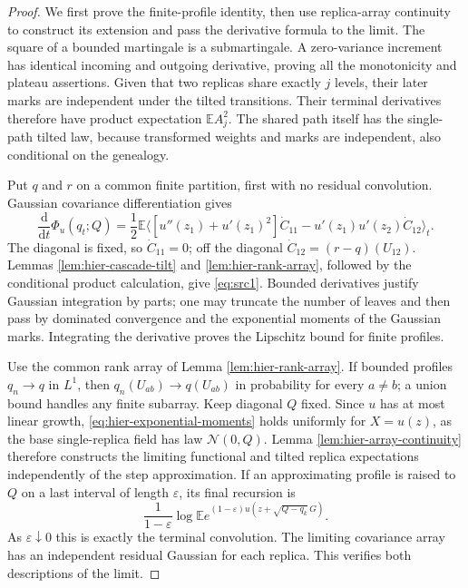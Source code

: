 \documentclass[11pt,a4paper]{article}
\numberwithin{equation}{section}
\theoremstyle{definition}
\theoremstyle{remark}
\newcommand{\E}{\mathbb E}
\newcommand{\dd}{\mathrm d}
\newcommand{\cN}{\mathcal N}
\begin{document}
\begin{proof}
We first prove the finite-profile identity, then use replica-array
continuity to construct its extension and pass the derivative formula to
the limit.
The square of a bounded martingale is a submartingale.  A zero-variance
increment has identical incoming and outgoing derivative, proving all the
monotonicity and plateau assertions.  Given that two replicas share exactly
$j$ levels, their later marks are independent under the tilted transitions.
Their terminal derivatives therefore have product expectation $\E A_j^2$.
The shared path itself has the single-path tilted law, because transformed
weights and marks are independent, also conditional on the genealogy.

Put $q$ and $r$ on a common finite partition, first with no residual
convolution.  Gaussian covariance differentiation gives
\[
 \frac{\dd}{\dd t}\Phi_u(q_t;Q)
 =\frac12\E\Big\langle
 [u''(z_1)+u'(z_1)^2]\dot C_{11}
       -u'(z_1)u'(z_2)\dot C_{12}\Big\rangle_t.
\]
The diagonal is fixed, so $\dot C_{11}=0$; off the diagonal
$\dot C_{12}=(r-q)(U_{12})$.  Lemmas
\ref{lem:hier-cascade-tilt} and \ref{lem:hier-rank-array}, followed by the
conditional product calculation, give \eqref{eq:src1}.  Bounded derivatives
justify Gaussian integration by parts; one may truncate the number of
leaves and then pass by dominated convergence and the exponential moments
of the Gaussian marks.  Integrating the derivative proves the Lipschitz
bound for finite profiles.

Use the common rank array of Lemma \ref{lem:hier-rank-array}.  If bounded
profiles $q_n\to q$ in $L^1$, then
$q_n(U_{ab})\to q(U_{ab})$ in probability for every $a\ne b$; a union bound
handles any finite subarray.  Keep diagonal $Q$ fixed.  Since $u$ has at
most linear growth, \eqref{eq:hier-exponential-moments} holds uniformly for
$X=u(z)$, as the base single-replica field has law $\cN(0,Q)$.  Lemma
\ref{lem:hier-array-continuity} therefore constructs the limiting functional
and tilted replica expectations independently of the step approximation.
If an approximating profile is raised to $Q$ on a last interval of length
$\varepsilon$, its final recursion is
\[
 \frac1{1-\varepsilon}\log
 \E e^{(1-\varepsilon)u(z+\sqrt{Q-q_k}\,G)}.
\]
As $\varepsilon\downarrow0$ this is exactly the terminal convolution.
The limiting covariance array has an independent residual Gaussian for
each replica.  This verifies both descriptions of the limit.


\end{proof}
\end{document}
